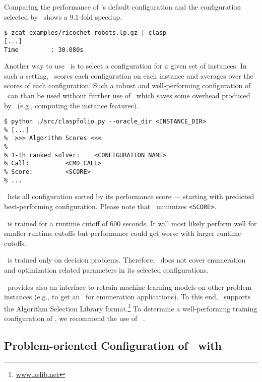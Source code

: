 Comparing the performance of \clasp's default configuration
and the configuration selected by \claspfolio\ shows a $9.1$-fold speedup.

\begin{lstlisting}[numbers=none]
$ zcat examples/ricochet_robots.lp.gz | clasp
[...]
Time         : 30.080s
\end{lstlisting}

Another way to use \claspfolio\ is to select a configuration for a given set of instances.
In such a setting, \claspfolio\ scores each configuration on each instance 
and averages over the scores of each configuration.
Such a robust and well-performing configuration of \clasp\ can than be used without further use of \claspfolio\
which saves some overhead produced by \claspfolio\ (e.g., computing the instance features).

\begin{lstlisting}[numbers=none]
$ python ./src/claspfolio.py --oracle_dir <INSTANCE_DIR>
% [...]
%  >>> Algorithm Scores <<<
% 
% 1-th ranked solver: 	 <CONFIGURATION NAME>
% Call: 		 <CMD CALL>
% Score: 		 <SCORE>
% ...
\end{lstlisting}
%
\claspfolio\ lists all configuration sorted by its performance score --- starting with predicted best-performing configuration.
Please note that \claspfolio\ minimizes \texttt{<SCORE>}.

\begin{note}
\claspfolio\ is trained for a runtime cutoff of $600$ seconds. 
It will most likely perform well for smaller runtime cutoffs 
but performance could get worse with larger runtime cutoffs.
\end{note}

\begin{note}
\claspfolio\ is trained only on decision problems.
Therefore, \claspfolio\ does not cover enumeration and optimization related parameters in its selected configurations.
\end{note}

\claspfolio\ provides also an interface to retrain machine learning models on other problem instances 
(e.g., to get an \claspfolio\ for enumeration applications).
To this end, \claspfolio\ supports the Algorithm Selection Library format.\footnote{\url{www.aslib.net}}
To determine a well-performing training configuration of \claspfolio,
we recommend the use of \sysfont{autofolio}~\cite{lihohusc15a}.%

\subsection{Problem-oriented Configuration of \clasp\ with \piclasp}
\label{sec:piclasp}

